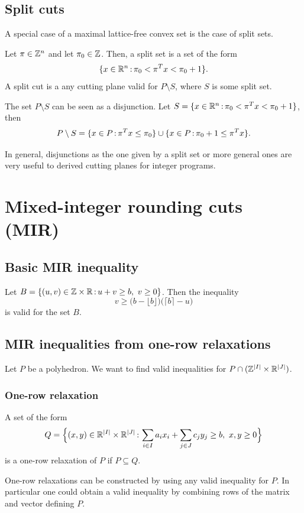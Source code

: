 \documentclass[../open-optimization/open-optimization.tex]{subfiles}
\begin{document}
\subsection{Split cuts}

A special case of a maximal lattice-free convex set is the case of split sets.

\begin{definition} Let $\pi\in{\mathbb{Z}}^n$ and let $\pi_0\in{\mathbb{Z}}$. Then, a split set is a set of the form
$$\{x\in{\mathbb{R}}^n{\,:\,} \pi_0<\pi^Tx<\pi_0+1\}.$$
A split cut is a any cutting plane valid for $P\setminus S$, where $S$ is some split set. 
\end{definition}


\begin{remark}
The set $P\setminus S$ can be seen as a disjunction. Let $S=\{x\in{\mathbb{R}}^n{\,:\,} \pi_0<\pi^Tx<\pi_0+1\}$, then
$$P\setminus S=\{x\in P{\,:\,} \pi^Tx\leq \pi_0\} \cup \{x\in P{\,:\,}\pi_0 +1\leq  \pi^Tx\}.$$

In general, disjunctions as the one given by a split set or more general ones are very useful to derived cutting planes for integer programs.
\end{remark}

\section{Mixed-integer rounding cuts (MIR)}
\subsection{Basic MIR inequality}\label{basicMIR}
Let $B=\{(u,v)\in {\mathbb{Z}}\times {\mathbb{R}}{\,:\,} u+v\geq b,\ v\geq0\}$. Then the inequality
$$v\geq \big(b-\lfloor b \rfloor\big)\big(\lceil b\rceil - u\big)$$
is valid for the set $B$.
\subsection{MIR inequalities from one-row relaxations}
Let $P$ be a polyhedron. We want to find valid inequalities for $P\cap ({\mathbb{Z}}^{|I|}\times {\mathbb{R}}^{|J|})$. 
\subsubsection{One-row relaxation}
A set of the form 
$$Q=\Big\{(x,y)\in {\mathbb{R}}^{|I|}\times {\mathbb{R}}^{|J|}{\,:\,} \sum_{i\in I}a_ix_i+\sum_{j\in J}c_jy_j\geq b,\ x,y\geq0\Big\}$$ 
is a one-row relaxation of $P$ if $P\subseteq Q$. 
\begin{remark}
One-row relaxations can be constructed by using any valid inequality for $P$. In particular one could obtain a valid inequality by combining rows of the matrix  and vector defining $P$.
\end{remark}
\end{document}
